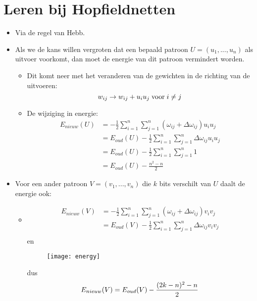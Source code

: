 \section{Leren bij Hopfieldnetten}
\begin{itemize}
    \item Via de regel van Hebb.
    \item Als we de kans willen vergroten dat een bepaald patroon $U = (u_1, ..., u_n)$ als uitvoer voorkomt, dan moet de energie van dit patroon vermindert worden. 
    \begin{itemize}
        \item Dit komt neer met het veranderen van de gewichten in de richting van de uitvoeren:
        $$w_{ij} \rightarrow w_{ij} + u_iu_j \; \hbox{voor}\; i \neq j$$
        \item De wijziging in energie:
        \begin{align*}
            E_{nieuw}(U) & = -\frac{1}{2}\sum_{i=1}^{n}\sum_{j=1}^{n} (\omega_{ij} + \Delta\omega_{ij})u_iu_j \\
                         & = E_{oud}(U) -\frac{1}{2}\sum_{i=1}^{n}\sum_{j=1}^{n} \Delta\omega_{ij}u_iu_j  \\
                         & = E_{oud}(U) -\frac{1}{2}\sum_{i=1}^{n}\sum_{j=1}^{n} 1 \\
                         & = E_{oud}(U) - \frac{n^2 - n}{2}
        \end{align*}
    \end{itemize}
    \item Voor een ander patroon $V = (v_1, ..., v_n)$ die $k$ bits verschilt van $U$ daalt de energie ook:
    \begin{itemize}
        \item \begin{align*}
            E_{nieuw}(V) & = -\frac{1}{2}\sum_{i=1}^{n}\sum_{j=1}^{n} (\omega_{ij} + \Delta\omega_{ij})v_iv_j \\
                         & = E_{oud}(V) -\frac{1}{2}\sum_{i=1}^{n}\sum_{j=1}^{n} \Delta\omega_{ij}v_iv_j  \\
        \end{align*}
        en
        \begin{figure}[ht]
            \centering
            \texttt{[image: energy]}
        \end{figure}

        dus
        $$E_{nieuw}(V) = E_{oud}(V) - \frac{(2k - n)^2 - n}{2} \\$$
    \end{itemize}

\end{itemize}

